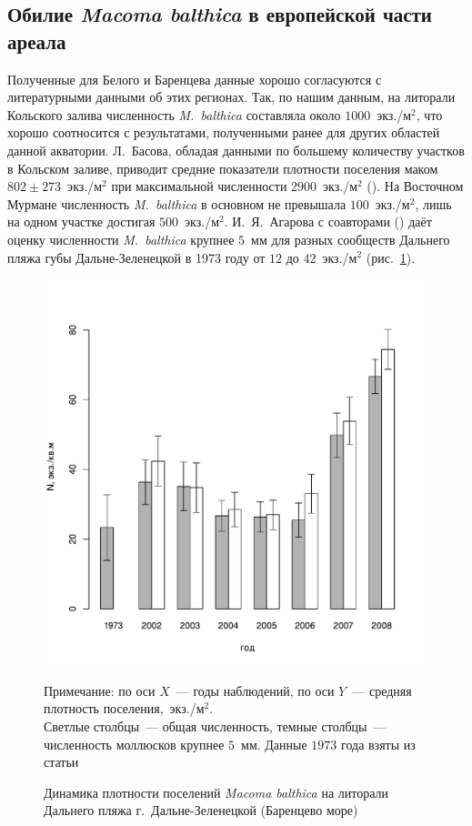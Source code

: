 		\subsection{Обилие {\it Macoma balthica} в европейской части ареала}
Полученные для Белого и Баренцева данные хорошо согласуются с литературными данными об этих регионах.
Так, по нашим данным, на литорали Кольского залива численность {\it M.~balthica} составляла около $1000$~экз./м$^2$, что хорошо соотносится с результатами, полученными ранее для других областей данной акватории. 
Л.~Басова, обладая данными по большему количеству участков в Кольском заливе, приводит средние показатели плотности поселения маком $802 \pm 273$~экз./м$^2$ при максимальной численности $2900$~экз./м$^2$ (\cite{Basova_2004}).
На Восточном Мурмане численность {\it M.~balthica} в основном не превышала $100$~экз./м$^2$, лишь на одном участке достигая $500$~экз./м$^2$. 
И.~Я.~Агарова с соавторами (\cite{Agarova_et_al_1976}) даёт оценку численности {\it M.~balthica} крупнее $5$~мм для разных сообществ Дальнего пляжа губы Дальне-Зеленецкой в 1973 году от $12$ до $42$~экз./м$^2$ (рис.~\ref{ris:dynamic_Zelency_Agarova}). 
	\begin{figure}[p]
		\includegraphics{../after_Deryuginskie/Macoma_N_dynamic_all1.pdf}
	\caption{Динамика плотности поселений {\it Macoma balthica} на литорали Дальнего пляжа г.~Дальне-Зеленецкой (Баренцево море)}
{\footnotesize Примечание: по оси $X$~--- годы наблюдений, по оси $Y$~--- средняя плотность поселения,~экз./м$^2$. \\
Светлые столбцы~--- общая численность, темные столбцы~--- численность моллюсков крупнее $5$~мм. Данные $1973$ года взяты из статьи \cite{Agarova_et_al_1976}}
	\label{ris:dynamic_Zelency_Agarova}
	\end{figure}
